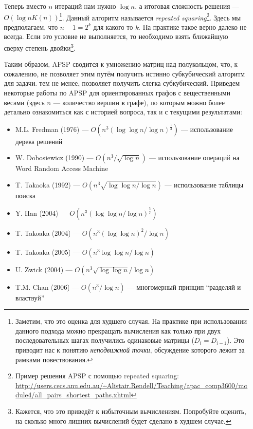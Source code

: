 Теперь вместо $n$ итераций нам нужно $\log{n}$, а итоговая сложность решения --- $O(\log{n} K(n))$\footnote{Заметим, что это оценка для худшего случая. На практике при использовании данного подхода можно прекращать вычисления как только при двух последовательных шагах получились одинаковые матрицы ($D_i = D_{i-1}$). Это приводит нас к понятию \textit{неподвижной точки}, обсуждение которого лежит за рамками повествования.}.
Данный алгоритм называется \textit{repeated squaring}\footnote{Пример решения APSP с помощью repeated squaring: \url{http://users.cecs.anu.edu.au/~Alistair.Rendell/Teaching/apac_comp3600/module4/all_pairs_shortest_paths.xhtml}}. Здесь мы предполагаем, что $n-1 = 2^k$ для какого-то $k$. На практике такое верно далеко не всегда. Если это условие не выполняется, то необходимо взять ближайшую сверху степень двойки\footnote{Кажется, что это приведёт к избыточным вычислениям. Попробуйте оценить, на сколько много лишних вычислений будет сделано в худшем случае.}. 

Таким образом, APSP сводится к умножению матриц над полукольцом, что, к сожалению, не позволяет этим путём получить истинно субкубический алгоритм для задачи. тем не менее, позволяет получить слегка субкубический. Приведем некоторые работы по APSP для ориентированных графов с вещественными весами (здесь $n$ --- количество вершин в графе), по которым можно более детально ознакомиться как с историей вопроса, так и с текущими результатами:
\begin{itemize}
    \item M.L. Fredman (1976) --- $O(n^3(\log \log n / \log n)^\frac{1}{3})$ --- использование дерева решений~\cite{FredmanAPSP1976}
    \item W. Dobosiewicz (1990) --- $O(n^3 / \sqrt{\log n})$ --- использование операций на Word Random Access Machine~\cite{Dobosiewicz1990}
    \item T. Takaoka (1992) --- $O(n^3 \sqrt{\log \log n / \log n})$ --- использование таблицы поиска~\cite{Takaoka1992}
    \item Y. Han (2004) --- $O(n^3 (\log \log n / \log n)^\frac{5}{7})$~\cite{Han2004}
    \item T. Takoaka (2004) --- $O(n^3 (\log \log n)^2 / \log n)$~\cite{Takaoka2004}
    \item T. Takoaka (2005) --- $O(n^3 \log \log n / \log n)$~\cite{Takaoka2005}
    \item U. Zwick (2004) --- $O(n^3 \sqrt{\log \log n} / \log n)$~\cite{Zwick2004}
    \item T.M. Chan (2006) --- $O(n^3 / \log n)$ --- многомерный принцип ``разделяй и властвуй''~\cite{Chan2008}
\end{itemize}

